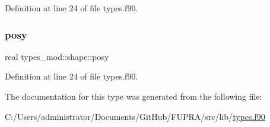 Definition at line 24 of file types.\+f90.

\mbox{\label{structtypes__mod_1_1shape_a0eadb644d5bf6cc0bdc1b966f7e7080e}} 
\subsubsection{\texorpdfstring{posy}{posy}}
{\footnotesize\ttfamily real types\+\_\+mod\+::shape\+::posy\hspace{0.3cm}{\ttfamily [private]}}



Definition at line 24 of file types.\+f90.



The documentation for this type was generated from the following file\+:\begin{DoxyCompactItemize}
\item 
C\+:/\+Users/administrator/\+Documents/\+Git\+Hub/\+F\+U\+P\+R\+A/src/lib/\mbox{\hyperlink{types_8f90}{types.\+f90}}\end{DoxyCompactItemize}
